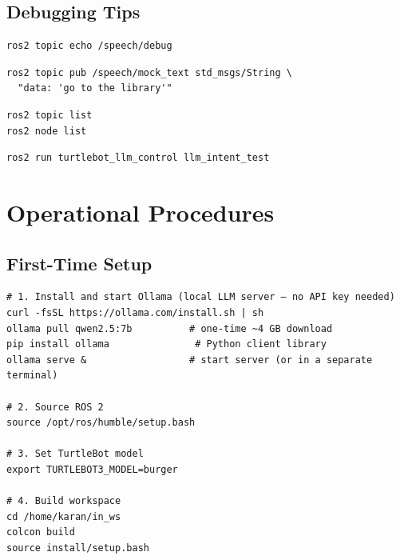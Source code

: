 \documentclass[12pt,a4paper]{report}
\begin{document}
\section{Debugging Tips}

\begin{tcolorbox}[tipbox, title=Tip: Monitor the full speech pipeline in one command]
\begin{lstlisting}[style=bashstyle]
ros2 topic echo /speech/debug
\end{lstlisting}
\end{tcolorbox}

\begin{tcolorbox}[tipbox, title=Tip: Inject a test command without a microphone]
\begin{lstlisting}[style=bashstyle]
ros2 topic pub /speech/mock_text std_msgs/String \
  "data: 'go to the library'"
\end{lstlisting}
\end{tcolorbox}

\begin{tcolorbox}[tipbox, title=Tip: List all active topics]
\begin{lstlisting}[style=bashstyle]
ros2 topic list
ros2 node list
\end{lstlisting}
\end{tcolorbox}

\begin{tcolorbox}[tipbox, title=Tip: Test intent parsing without launching everything]
\begin{lstlisting}[style=bashstyle]
ros2 run turtlebot_llm_control llm_intent_test
\end{lstlisting}
\end{tcolorbox}

\chapter{Operational Procedures}
\label{ch:ops}

\section{First-Time Setup}

\begin{lstlisting}[style=bashstyle, caption={Complete first-time setup sequence}]
# 1. Install and start Ollama (local LLM server — no API key needed)
curl -fsSL https://ollama.com/install.sh | sh
ollama pull qwen2.5:7b          # one-time ~4 GB download
pip install ollama               # Python client library
ollama serve &                  # start server (or in a separate terminal)

# 2. Source ROS 2
source /opt/ros/humble/setup.bash

# 3. Set TurtleBot model
export TURTLEBOT3_MODEL=burger

# 4. Build workspace
cd /home/karan/in_ws
colcon build
source install/setup.bash
\end{lstlisting}
\end{document}
